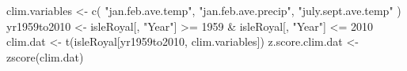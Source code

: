 \begin{Schunk}
\begin{Sinput}
 clim.variables <- c(
   "jan.feb.ave.temp", "jan.feb.ave.precip",
   "july.sept.ave.temp"
 )
 yr1959to2010 <- isleRoyal[, "Year"] >= 1959 & isleRoyal[, "Year"] <= 2010
 clim.dat <- t(isleRoyal[yr1959to2010, clim.variables])
 z.score.clim.dat <- zscore(clim.dat)
\end{Sinput}
\end{Schunk}
